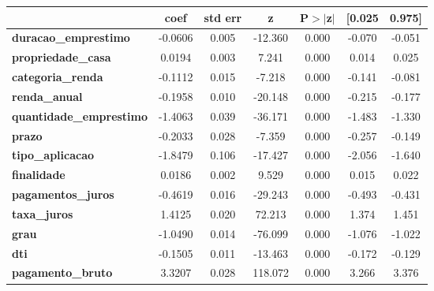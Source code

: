 \centering
\begin{tabular}{lcccccc}
  & \textbf{coef} & \textbf{std err} & \textbf{z} & \textbf{P$> |$z$|$} & \textbf{[0.025} & \textbf{0.975]}  \\
\midrule
\textbf{duracao\_emprestimo}       &      -0.0606  &        0.005     &   -12.360  &         0.000        &       -0.070    &       -0.051     \\
\textbf{propriedade\_casa}         &       0.0194  &        0.003     &     7.241  &         0.000        &        0.014    &        0.025     \\
\textbf{categoria\_renda}          &      -0.1112  &        0.015     &    -7.218  &         0.000        &       -0.141    &       -0.081     \\
\textbf{renda\_anual}              &      -0.1958  &        0.010     &   -20.148  &         0.000        &       -0.215    &       -0.177     \\
\textbf{quantidade\_emprestimo}    &      -1.4063  &        0.039     &   -36.171  &         0.000        &       -1.483    &       -1.330     \\
\textbf{prazo}                     &      -0.2033  &        0.028     &    -7.359  &         0.000        &       -0.257    &       -0.149     \\
\textbf{tipo\_aplicacao}           &      -1.8479  &        0.106     &   -17.427  &         0.000        &       -2.056    &       -1.640     \\
\textbf{finalidade}                &       0.0186  &        0.002     &     9.529  &         0.000        &        0.015    &        0.022     \\
\textbf{pagamentos\_juros}         &      -0.4619  &        0.016     &   -29.243  &         0.000        &       -0.493    &       -0.431     \\
\textbf{taxa\_juros}               &       1.4125  &        0.020     &    72.213  &         0.000        &        1.374    &        1.451     \\
\textbf{grau}                      &      -1.0490  &        0.014     &   -76.099  &         0.000        &       -1.076    &       -1.022     \\
\textbf{dti}                       &      -0.1505  &        0.011     &   -13.463  &         0.000        &       -0.172    &       -0.129     \\
\textbf{pagamento\_bruto}          &       3.3207  &        0.028     &   118.072  &         0.000        &        3.266    &        3.376     \\

\end{tabular}
